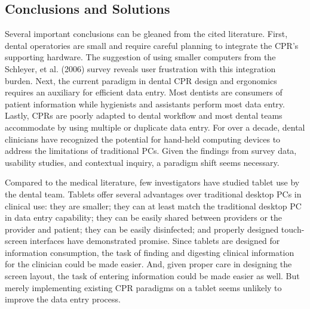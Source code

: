 \documentclass[11pt]{article}
\begin{document}
\subsection{Conclusions and Solutions}
Several important conclusions can be gleaned from the cited literature. First, dental operatories are small and require careful planning to integrate the CPR's supporting hardware. The suggestion of using smaller computers from the Schleyer, et al. (2006) survey reveals user frustration with this integration burden. Next, the current paradigm in dental CPR design and ergonomics requires an auxiliary for efficient data entry. Most dentists are consumers of patient information while hygienists and assistants perform most data entry. Lastly, CPRs are poorly adapted to dental workflow and most dental teams accommodate by using multiple or duplicate data entry. For over a decade, dental clinicians have recognized the potential for hand-held computing devices to address the limitations of traditional PCs.\cite{Taylor2002Handheld-comput,Jablow2003Your-practice-i} Given the findings from survey data, usability studies, and contextual inquiry, a paradigm shift seems necessary.

Compared to the medical literature, few investigators have studied tablet use by the dental team.\cite{Frank2010IPad--tool-or-t} Tablets offer several advantages over traditional desktop PCs in clinical use: they are smaller; they can at least match the traditional desktop PC in data entry capability\cite{Kirby1996The-PEN--PAD-da,Mackenzi2002Text-entry-for-}; they can be easily shared between providers or the provider and patient; they can be easily disinfected\cite{Mayrhofer2007Pen-based-Elect}; and properly designed touch-screen interfaces have demonstrated promise.\cite{Haller2009Handheld-vs.-la,Mulligen1998Clinical-data-e,Baumgart2005Personal-digita,Lu2005A-review-and-a-} Since tablets are designed for information consumption, the task of finding and digesting clinical information for the clinician could be made easier. And, given proper care in designing the screen layout, the task of entering information could be made easier as well. But merely implementing existing CPR paradigms on a tablet seems unlikely to improve the data entry process.
\end{document}
